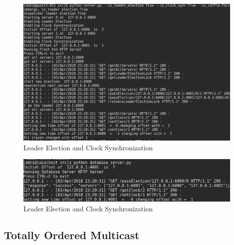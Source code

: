 \documentclass{article}
\begin{document}
\begin{figure}[H]
        \centering
        \includegraphics[width=\textwidth]{outputs/clock_sync_server.png}
        \caption{Leader Election and Clock Synchronization \label{fig:clong_synchronization}}
\end{figure}
\begin{figure}[H]
        \centering
        \includegraphics[width=\textwidth]{outputs/clock_sync_db.png}
        \caption{Leader Election and Clock Synchronization \label{fig:clong_synchronization}}
\end{figure}
\subsection{Totally Ordered Multicast}
\end{document}
